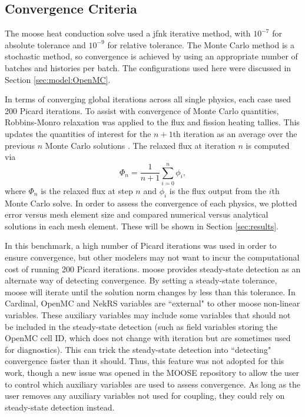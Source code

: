 \documentclass[letterpaper]{mc2023}
\begin{document}
\subsection{Convergence Criteria}
The \gls{moose} heat conduction solve used a \gls{jfnk} iterative method, with $10^{-7}$ for absolute tolerance and $10^{-9}$ for
relative tolerance. The Monte Carlo method is a stochastic method, so convergence is achieved by using an appropriate number of
batches and histories per batch. The configurations used here were discussed in Section \ref{sec:model:OpenMC}.

In terms of converging global iterations across all single physics, each case used 200 Picard iterations. To assist with
convergence of Monte Carlo quantities, Robbins-Monro relaxation was applied to the flux and fission heating tallies. This updates the
quantities of interest for the $n+1$th iteration as an average over the previous $n$ Monte Carlo solutions \cite{dufek}.
The relaxed flux at iteration $n$ is computed via
\begin{equation}\label{eq:Robbins-Monro}
    \Phi_{n} = \frac{1}{n+1} \sum_{i=0}^{n} \phi_{i},
\end{equation}
where $\Phi_{n}$ is the relaxed flux at step $n$ and $\phi_{i}$ is the flux output from the $i$th Monte Carlo solve. In order to assess
the convergence of each physics, we plotted error versus mesh element size and compared numerical versus analytical solutions in each
mesh element. These will be shown in Section \ref{sec:results}.

In this benchmark, a high number of Picard iterations was used in order to ensure convergence, but other modelers may not want to incur
the computational cost of running 200 Picard iterations. \gls{moose} provides steady-state detection as an alternate way of detecting
convergence. By setting a steady-state tolerance, \gls{moose} will iterate until the solution norm changes by less than this tolerance.
In Cardinal, OpenMC and NekRS variables are ``external" to other \gls{moose} non-linear variables. These auxiliary variables may include
some variables that should not be included in the steady-state detection (such as field variables storing the OpenMC cell ID, which does
not change with iteration but are sometimes used for diagnostics). This can trick the steady-state detection into ``detecting" convergence
faster than it should. Thus, this feature was not adopted for this work, though a new issue was opened in the MOOSE repository to allow
the user to control which auxiliary variables are used to assess convergence.  As long as the user removes any auxiliary variables not
used for coupling, they could rely on steady-state detection instead.
\end{document}
